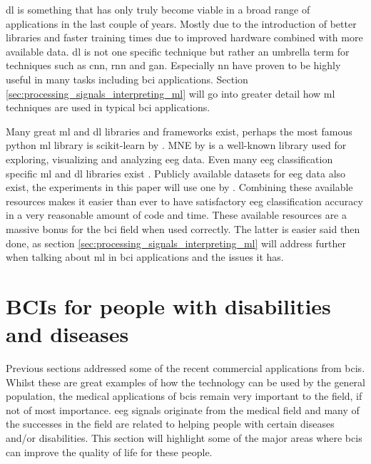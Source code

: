 \Gls{dl} is something that has only truly become viable in a broad range of applications in the last couple of years.
Mostly due to the introduction of better libraries and faster training times due to improved hardware combined with more available data.
\Gls{dl} is not one specific technique but rather an umbrella term for techniques such as \gls{cnn}, \gls{rnn} and \gls{gan}.
Especially \gls{nn} have proven to be highly useful in many tasks including \gls{bci} applications.
Section \ref{sec:processing_signals_interpreting_ml} will go into greater detail how \gls{ml} techniques are used in typical \gls{bci} applications.

Many great \gls{ml} and \gls{dl} libraries and frameworks exist, perhaps the most famous python \gls{ml} library is scikit-learn by \citet{sklearn}.
MNE by \citet{mne} is a well-known library used for exploring, visualizing and analyzing \gls{eeg} data.
Even many \gls{eeg} classification specific \gls{ml} and \gls{dl} libraries exist \citep{eeg_model_eegnet, eeg_model_esi, eeg_model_fbcsp, eeg_model_hbm, eeg_model_ssvep}.
Publicly available datasets for \gls{eeg} data also exist, the experiments in this paper will use one by \citet{eeg_data}.
Combining these available resources makes it easier than ever to have satisfactory \gls{eeg} classification accuracy in a very reasonable amount of code and time.
These available resources are a massive bonus for the \gls{bci} field when used correctly.
The latter is easier said then done, as section \ref{sec:processing_signals_interpreting_ml} will address further when talking about \gls{ml} in \gls{bci} applications and the issues it has.


\section{BCIs for people with disabilities and diseases}
\label{sec:bci_helping_disabled}

Previous sections addressed some of the recent commercial applications from \glspl{bci}.
Whilst these are great examples of how the technology can be used by the general population, the medical applications of \glspl{bci} remain very important to the field, if not of most importance.
\gls{eeg} signals originate from the medical field and many of the successes in the field are related to helping people with certain diseases and/or disabilities.
This section will highlight some of the major areas where \glspl{bci} can improve the quality of life for these people.

